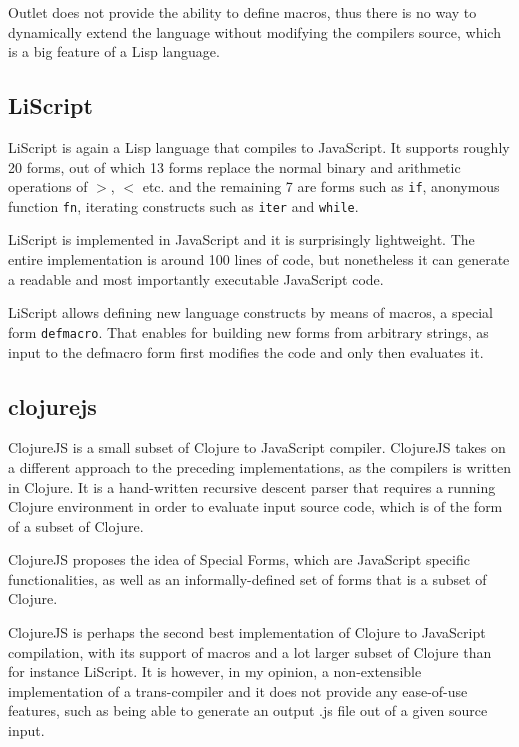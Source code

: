 Outlet does not provide the ability to define macros, thus there is no way to dynamically extend the language without modifying the compilers source, which is a big feature of a Lisp language.

\subsection{LiScript}
LiScript\cite{LiScript:2013:Site} is again a Lisp language that compiles to JavaScript. It supports roughly 20 forms, out of which 13 forms replace the normal binary and arithmetic operations of \texttt{$>$}, \texttt{$<$} etc. and the remaining 7 are forms such as \texttt{if}, anonymous function \texttt{fn}, iterating constructs such as \texttt{iter} and \texttt{while}.

LiScript is implemented in JavaScript and it is surprisingly lightweight. The entire implementation is around 100 lines of code, but nonetheless it can generate a readable and most importantly executable JavaScript code. 

LiScript allows defining new language constructs by means of macros, a special form \texttt{defmacro}. That enables for building new forms from arbitrary strings, as input to the defmacro form first modifies the code and only then evaluates it. 

\subsection{clojurejs}
ClojureJS\cite{ClojureJS:2011:Site} is a small subset of Clojure to JavaScript compiler.
ClojureJS takes on a different approach to the preceding implementations, as the compilers is written in Clojure. 
It is a hand-written recursive descent parser that requires a running Clojure environment in order to evaluate input source code, which is of the form of a subset of Clojure.

ClojureJS proposes the idea of Special Forms, which are JavaScript specific functionalities, as well as an informally-defined set of forms that is a subset of Clojure.

ClojureJS is perhaps the second best implementation of Clojure to JavaScript compilation, with its support of macros and a lot larger subset of Clojure than for instance LiScript. 
It is however, in my opinion, a non-extensible implementation of a trans-compiler and it does not provide any ease-of-use features, such as being able to generate an output .js file out of a given source input. 
